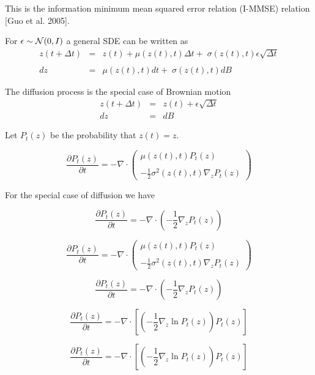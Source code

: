 {{\vfill
This is the information minimum mean squared error relation (I-MMSE) relation [Guo et al. 2005].
}


For $\epsilon \sim {\cal N}(0,I)$ a general SDE can be written as
\begin{eqnarray*}
z(t+\Delta t) & = & z(t) + \mu(z(t),t)\Delta t + \; \sigma(z(t),t)\epsilon\sqrt{\Delta t} \\
\\
dz & = & \mu(z(t),t)dt + \; \sigma(z(t),t)dB
\end{eqnarray*}

\vfill
The diffusion process is the special case of Brownian motion
\begin{eqnarray*}
z(t + \Delta t) & = & z(t) + \epsilon \sqrt{\Delta t} \\
dz & = & dB
\end{eqnarray*}


Let $P_t(z)$ be the probability that $z(t) = z$.

$$\frac{\partial P_t(z)}{\partial t} = - \nabla \cdot\left(\begin{array}{l}\mu(z(t),t)P_t(z) \\ \\ - \frac{1}{2}\sigma^2(z(t),t) \nabla_z P_t(z)\end{array}\right)$$

\vfill
For the special case of diffusion we have

$$\frac{\partial P_t(z)}{\partial t} = - \nabla \cdot\left(-\frac{1}{2}\nabla_z P_t(z)\right)$$


$$\frac{\partial P_t(z)}{\partial t} = - \nabla \cdot\left(\begin{array}{l}\mu(z(t),t)P_t(z) \\ \\ - \frac{1}{2}\sigma^2(z(t),t) \nabla_z P_t(z)\end{array}\right)$$

\vfill
$$\frac{\partial P_t(z)}{\partial t} = - \nabla \cdot\left(-\frac{1}{2}\nabla_z P_t(z)\right)$$

\vfill
$$\frac{\partial P_t(z)}{\partial t} = - \nabla \cdot\left[\left(-\frac{1}{2}\nabla_z \ln P_t(z)\right)P_t(z)\right]$$


$$\frac{\partial P_t(z)}{\partial t} = - \nabla \cdot\left[\left(-\frac{1}{2}\nabla_z \ln P_t(z)\right)P_t(z)\right]$$

}
